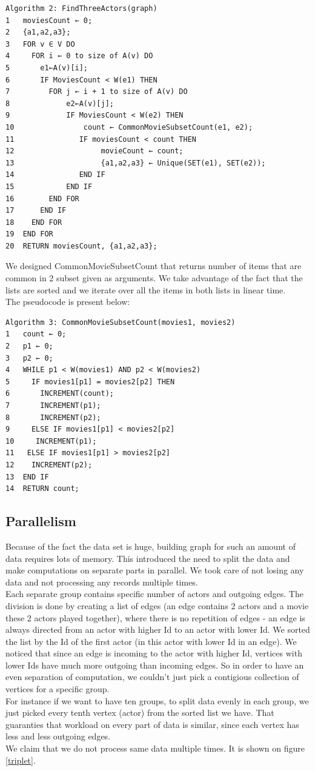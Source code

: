 \begin{verbatim}
Algorithm 2: FindThreeActors(graph)
1	moviesCount ← 0;
2	{a1,a2,a3};
3	FOR v ∈ V DO
4	  FOR i ← 0 to size of A(v) DO
5	    e1←A(v)[i];
6	    IF MoviesCount < W(e1) THEN
7	      FOR j ← i + 1 to size of A(v) DO	          
8	          e2←A(v)[j];
9	          IF MoviesCount < W(e2) THEN
10	              count ← CommonMovieSubsetCount(e1, e2);
11	             IF moviesCount < count THEN
12	                  movieCount ← count;
13	                  {a1,a2,a3} ← Unique(SET(e1), SET(e2));
14	             END IF
15	          END IF
16	      END FOR
17	    END IF
18	  END FOR
19	END FOR
20	RETURN moviesCount, {a1,a2,a3};	  	                    	  
\end{verbatim}


We designed CommonMovieSubsetCount that returns number of items that are common in 2 subset given as arguments. We take advantage of the fact that the lists are sorted and we iterate over all the items in both lists in linear time. 
\\
The pseudocode is present below:

\begin{verbatim}
Algorithm 3: CommonMovieSubsetCount(movies1, movies2)
1	count ← 0;
2	p1 ← 0;
3	p2 ← 0;
4	WHILE p1 < W(movies1) AND p2 < W(movies2)
5	  IF movies1[p1] = movies2[p2] THEN
6	    INCREMENT(count);
7	    INCREMENT(p1);
8	    INCREMENT(p2);
9	  ELSE IF movies1[p1] < movies2[p2]
10	   INCREMENT(p1);
11	 ELSE IF movies1[p1] > movies2[p2]
12	  INCREMENT(p2);
13	END IF
14	RETURN count;
\end{verbatim}

\subsection{Parallelism}
\label{Parallelism}
Because of the fact the data set is huge, building graph for such an amount of data requires lots of memory. This introduced the need to split the data and make computations on separate parts in parallel. We took care of not losing any data and not processing any records multiple times.
\\
Each separate group contains specific number of actors and outgoing edges. The division is done by creating a list of edges (an edge contains 2 actors and a movie these 2 actors played together), where there is no repetition of edges - an edge is always directed from an actor with higher Id to an actor with lower Id. We sorted the list by the Id of the first actor (in this actor with lower Id in an edge). We noticed that since an edge is incoming to the actor with higher Id, vertices with lower Ids have much more outgoing than incoming edges. So in order to have an even separation of computation, we couldn't just pick a contigious collection of vertices for a specific group.
\\
For instance if we want to have ten groups, to split data evenly in each group, we just picked every tenth vertex (actor) from the sorted list we have. That guaranties that workload on every part of data is similar, since each vertex has less and less outgoing edges.
\\
We claim that we do not process same data multiple times. It is shown on figure \ref{triplet}.

